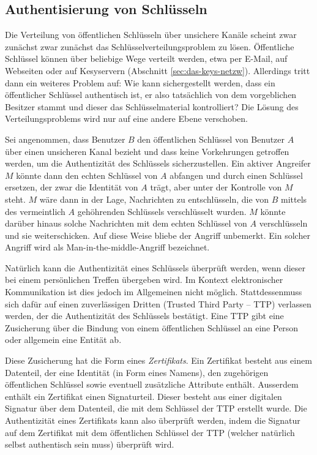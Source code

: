 \subsection{Authentisierung von Schlüsseln}
\label{ch:Grundlagen:sec:PublicKeyCrypto:subsec:KeyAuth}
Die Verteilung von \"offentlichen Schl\"usseln \"uber unsichere
Kan\"ale scheint zwar zun\"achst zwar zun\"achst das
Schl\"usselverteilungsproblem zu l\"osen. \"Offentliche Schl\"ussel
k\"onnen \"uber beliebige Wege verteilt werden, etwa per E-Mail, auf
Webseiten oder auf Kesyservern (Abschnitt
\ref{sec:das-keys-netzw}). Allerdings tritt dann ein weiteres Problem
auf: Wie kann sichergestellt werden, dass ein \"offentlicher
Schl\"ussel authentisch ist, er also tats\"achlich von dem
vorgeblichen Besitzer stammt und dieser das Schl\"usselmaterial
kontrolliert? Die L\"osung des Verteilungsproblems wird nur auf eine
andere Ebene verschoben.

Sei angenommen, dass Benutzer $B$ den \"offentlichen Schl\"ussel von
Benutzer $A$ \"uber einen unsicheren Kanal bezieht und dass keine
Vorkehrungen getroffen werden, um die Authentizit\"at des Schl\"ussels
sicherzustellen. Ein aktiver Angreifer $M$ k\"onnte dann den echten
Schl\"ussel von $A$ abfangen und durch einen Schl\"ussel ersetzen, der
zwar die Identit\"at von $A$ tr\"agt, aber unter der Kontrolle von $M$
steht. $M$ w\"are dann in der Lage, Nachrichten zu entschl\"usseln,
die von $B$ mittels des vermeintlich $A$ geh\"ohrenden Schl\"ussels
verschl\"usselt wurden. $M$ k\"onnte dar\"uber hinaus solche
Nachrichten mit dem echten Schl\"ussel von $A$ verschl\"usseln und sie
weiterschicken. Auf diese Weise bliebe der Angriff unbemerkt. Ein
solcher Angriff wird als Man-in-the-middle-Angriff bezeichnet.

Nat\"urlich kann die Authentizit\"at eines Schl\"ussels \"uberpr\"uft
werden, wenn dieser bei einem pers\"onlichen Treffen \"ubergeben
wird. Im Kontext elektronischer Kommunikation ist dies jedoch im
Allgemeinen nicht m\"oglich. Stattdessenmuss sich daf\"ur auf einen
zuverl\"assigen Dritten (Trusted Third Party -- TTP) verlassen werden,
der die Authentizit\"at des Schl\"ussels best\"atigt. Eine TTP gibt
eine Zusicherung \"uber die Bindung von einem \"offentlichen
Schl\"ussel an eine Person oder allgemein eine Entit\"at ab.

Diese Zusicherung hat die Form eines \emph{Zertifikats}. Ein
Zertifikat besteht aus einem Datenteil, der eine Identit\"at (in Form
eines Namens), den zugeh\"origen \"offentlichen Schl\"ussel sowie
eventuell zus\"atzliche Attribute enth\"alt. Ausserdem enth\"alt ein
Zertifikat einen Signaturteil. Dieser besteht aus einer digitalen
Signatur \"uber dem Datenteil, die mit dem Schl\"ussel der TTP
erstellt wurde. Die Authentizit\"at eines Zertifikats kann also
\"uberpr\"uft werden, indem die Signatur auf dem Zertifikat mit dem
\"offentlichen Schl\"ussel der TTP (welcher nat\"urlich selbst
authentisch sein muss) \"uberpr\"uft wird.

